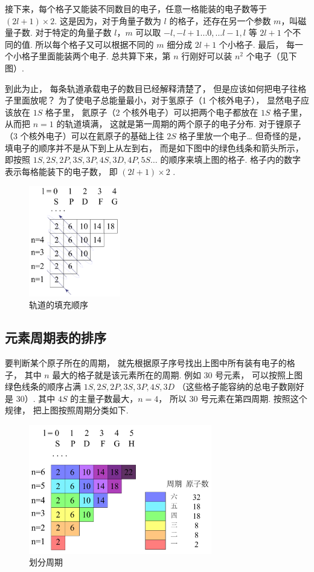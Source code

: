 接下来，每个格子又能装不同数目的电子，任意一格能装的电子数等于 $\left( {2l + 1} \right) \times 2$. 这是因为，对于角量子数为 $l$ 的格子，还存在另一个参数 $m$，叫磁量子数. 对于特定的角量子数 $l$，$m$ 可以取 $ - l, - l + 1...0,...l - 1,l$ 等 $2l + 1$ 个不同的值. 所以每个格子又可以根据不同的 $m$ 细分成 $2l+1$ 个小格子. 最后， 每一个小格子里面能装两个电子. 总共算下来，第 $n$ 行刚好可以装 $n^2$ 个电子（见下图）.

到此为止， 每条轨道承载电子的数目已经解释清楚了， 但是应该如何把电子往格子里面放呢？ 为了使电子总能量最小，对于氢原子（1 个核外电子）， 显然电子应该放在 $1S$ 格子里， 氦原子（2 个核外电子）可以把两个电子都放在 $1S$ 格子里， 从而把 $n=1$ 的轨道填满， 这就是第一周期的两个原子的电子分布. 对于锂原子（3 个核外电子）可以在氦原子的基础上往 $2S$ 格子里放一个电子… 但奇怪的是， 填电子的顺序并不是从下到上从左到右， 而是如下图中的绿色线条和箭头所示， 即按照 $1S, 2S, 2P, 3S, 3P, 4S, 3D, 4P, 5S…$ 的顺序来填上图的格子. 格子内的数字表示每格能装下的电子数， 即 $\left( {2l + 1} \right) \times 2$ .
\begin{figure}[h]
\centering
\includegraphics[width=4cm]{./figures/Ptable3.pdf}
\caption{轨道的填充顺序} 
\end{figure}

\subsection{元素周期表的排序}

要判断某个原子所在的周期， 就先根据原子序号找出上图中所有装有电子的格子， 其中 $n$ 最大的格子就是该元素所在的周期. 例如 30 号元素， 可以按照上图绿色线条的顺序占满 $1S, 2S, 2P, 3S, 3P, 4S, 3D$ （这些格子能容纳的总电子数刚好是 30）. 其中 $4S$ 的主量子数最大，$n=4$， 所以 30 号元素在第四周期. 按照这个规律， 把上图按照周期分类如下.
\begin{figure}[h]
\centering
\includegraphics[width=8cm]{./figures/Ptable4.pdf}
\caption{划分周期} 
\end{figure}

